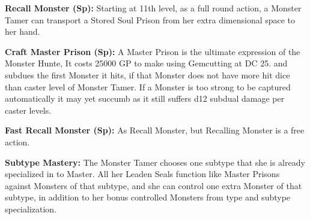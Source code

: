 \textbf{Recall Monster (Sp):} Starting at 11th level, as a full round action, a Monster Tamer can transport a Stored Soul Prison from her extra dimensional space to her hand.

\textbf{Craft Master Prison (Sp):} A Master Prison is the ultimate expression of the Monster Hunte, It costs 25000 GP to make using  Gemcutting at DC 25. and subdues the first Monster it hits, if that Monster does not have more hit dice than caster level of Monster Tamer. If a Monster is too strong to be captured automatically it may yet succumb as it still suffers d12
subdual damage per caster levels.

\textbf{Fast Recall Monster (Sp):} As Recall Monster, but Recalling Monster is a free action.

\textbf{Subtype Mastery:} The Monster Tamer chooses one subtype that she is already specialized in to Master. All her Leaden Seals function
like Master Prisons against Monsters of that subtype, and she can control one extra Monster of that subtype, in addition to her bonus controlled Monsters from type and subtype specialization.


